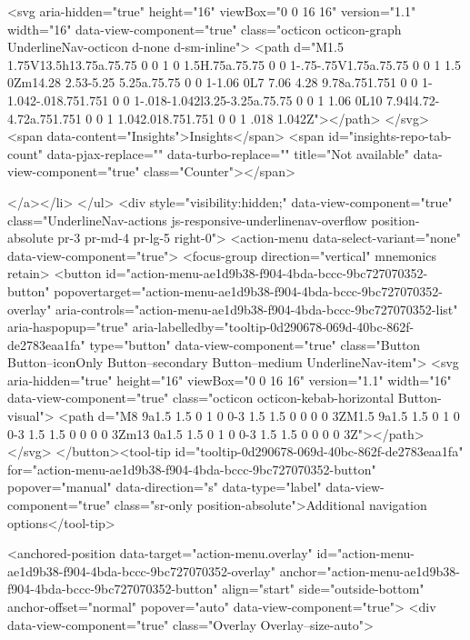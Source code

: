               <svg aria-hidden="true" height="16" viewBox="0 0 16 16" version="1.1" width="16" data-view-component="true" class="octicon octicon-graph UnderlineNav-octicon d-none d-sm-inline">
    <path d="M1.5 1.75V13.5h13.75a.75.75 0 0 1 0 1.5H.75a.75.75 0 0 1-.75-.75V1.75a.75.75 0 0 1 1.5 0Zm14.28 2.53-5.25 5.25a.75.75 0 0 1-1.06 0L7 7.06 4.28 9.78a.751.751 0 0 1-1.042-.018.751.751 0 0 1-.018-1.042l3.25-3.25a.75.75 0 0 1 1.06 0L10 7.94l4.72-4.72a.751.751 0 0 1 1.042.018.751.751 0 0 1 .018 1.042Z"></path>
</svg>
        <span data-content="Insights">Insights</span>
          <span id="insights-repo-tab-count" data-pjax-replace="" data-turbo-replace="" title="Not available" data-view-component="true" class="Counter"></span>


    
</a></li>
</ul>
    <div style="visibility:hidden;" data-view-component="true" class="UnderlineNav-actions js-responsive-underlinenav-overflow position-absolute pr-3 pr-md-4 pr-lg-5 right-0">      <action-menu data-select-variant="none" data-view-component="true">
  <focus-group direction="vertical" mnemonics retain>
    <button id="action-menu-ae1d9b38-f904-4bda-bccc-9bc727070352-button" popovertarget="action-menu-ae1d9b38-f904-4bda-bccc-9bc727070352-overlay" aria-controls="action-menu-ae1d9b38-f904-4bda-bccc-9bc727070352-list" aria-haspopup="true" aria-labelledby="tooltip-0d290678-069d-40bc-862f-de2783eaa1fa" type="button" data-view-component="true" class="Button Button--iconOnly Button--secondary Button--medium UnderlineNav-item">  <svg aria-hidden="true" height="16" viewBox="0 0 16 16" version="1.1" width="16" data-view-component="true" class="octicon octicon-kebab-horizontal Button-visual">
    <path d="M8 9a1.5 1.5 0 1 0 0-3 1.5 1.5 0 0 0 0 3ZM1.5 9a1.5 1.5 0 1 0 0-3 1.5 1.5 0 0 0 0 3Zm13 0a1.5 1.5 0 1 0 0-3 1.5 1.5 0 0 0 0 3Z"></path>
</svg>
</button><tool-tip id="tooltip-0d290678-069d-40bc-862f-de2783eaa1fa" for="action-menu-ae1d9b38-f904-4bda-bccc-9bc727070352-button" popover="manual" data-direction="s" data-type="label" data-view-component="true" class="sr-only position-absolute">Additional navigation options</tool-tip>


<anchored-position data-target="action-menu.overlay" id="action-menu-ae1d9b38-f904-4bda-bccc-9bc727070352-overlay" anchor="action-menu-ae1d9b38-f904-4bda-bccc-9bc727070352-button" align="start" side="outside-bottom" anchor-offset="normal" popover="auto" data-view-component="true">
  <div data-view-component="true" class="Overlay Overlay--size-auto">
    
